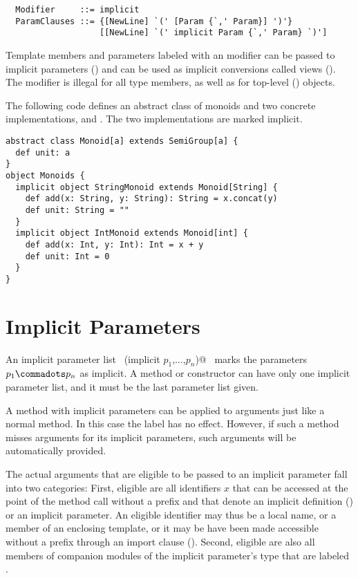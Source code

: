 \syntax\begin{lstlisting}
  Modifier     ::= implicit
  ParamClauses ::= {[NewLine] `(' [Param {`,' Param}] ')'} 
                   [[NewLine] `(' implicit Param {`,' Param} `)']
\end{lstlisting}

Template members and parameters labeled with an 
modifier can be passed to implicit parameters ()
and can be used as implicit conversions called views
(). The  modifier is illegal for all
type members, as well as for top-level ()
objects.

\example\label{ex:impl-monoid}
The following code defines an abstract class of monoids and
two concrete implementations,  and
. The two implementations are marked implicit.

\begin{lstlisting}
abstract class Monoid[a] extends SemiGroup[a] {
  def unit: a
}
object Monoids {
  implicit object StringMonoid extends Monoid[String] {
    def add(x: String, y: String): String = x.concat(y)
    def unit: String = ""
  }
  implicit object IntMonoid extends Monoid[int] {
    def add(x: Int, y: Int): Int = x + y
    def unit: Int = 0
  }
}
\end{lstlisting}

\section{Implicit Parameters}\label{sec:impl-params}

An implicit parameter list
~\lstinline@(implicit $p_1$,$\ldots$,$p_n$)@~ marks the parameters $p_1 \commadots p_n$ as
implicit. A method or constructor can have only one implicit parameter
list, and it must be the last parameter list given.

A method with implicit parameters can be applied to arguments just
like a normal method. In this case the  label has no
effect. However, if such a method misses arguments for its implicit
parameters, such arguments will be automatically provided.

The actual arguments that are eligible to be passed to an implicit
parameter fall into two categories: First, eligible are all
identifiers $x$ that can be accessed at the point of the method call
without a prefix and that denote an implicit definition
() or an implicit parameter. An eligible
identifier may thus be a local name, or a member of an enclosing
template, or it may be have been made accessible without a prefix
through an import clause (). Second, eligible are
also all members of companion modules of the implicit parameter's type
that are labeled .

